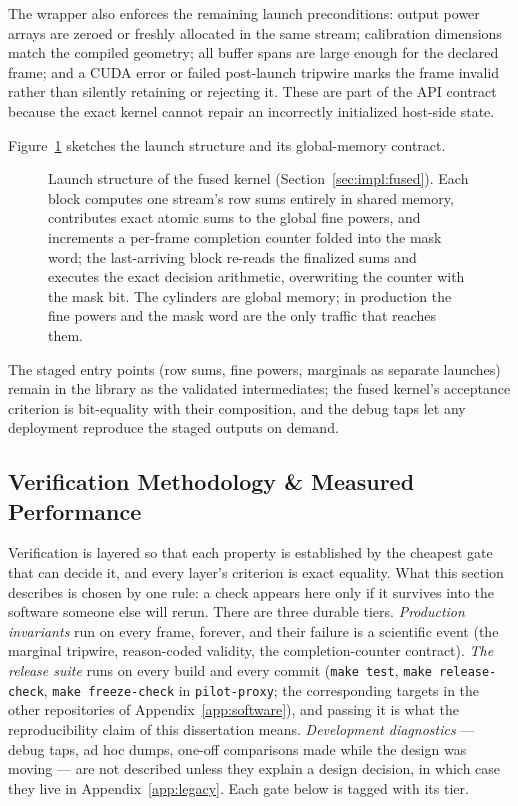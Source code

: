 The wrapper also enforces the remaining launch preconditions: output power arrays are zeroed or freshly allocated in the same stream; calibration dimensions match the compiled geometry; all buffer spans are large enough for the declared frame; and a CUDA error or failed post-launch tripwire marks the frame invalid rather than silently retaining or rejecting it.  These are part of the API contract because the exact kernel cannot repair an incorrectly initialized host-side state.

Figure~\ref{fig:fused} sketches the launch structure and its global-memory contract.

\begin{figure}[t]
\centering
\resizebox{\linewidth}{!}{}
\caption[Launch structure of the fused kernel]{Launch structure of the fused kernel (Section~\ref{sec:impl:fused}). Each block computes one stream's row sums entirely in shared memory, contributes exact atomic sums to the global fine powers, and increments a per-frame completion counter folded into the mask word; the last-arriving block re-reads the finalized sums and executes the exact decision arithmetic, overwriting the counter with the mask bit. The cylinders are global memory; in production the fine powers and the mask word are the only traffic that reaches them.}
\label{fig:fused}
\end{figure}

The staged entry points (row sums, fine powers, marginals as separate launches) remain in the library as the validated intermediates; the fused kernel's acceptance criterion is bit-equality with their composition, and the debug taps let any deployment reproduce the staged outputs on demand.

\subsection{Verification Methodology \& Measured Performance}
\label{sec:impl:verify}
Verification is layered so that each property is established by the cheapest gate that can decide it, and every layer's criterion is exact equality. What this section describes is chosen by one rule: a check appears here only if it survives into the software someone else will rerun. There are three durable tiers. \emph{Production invariants} run on every frame, forever, and their failure is a scientific event (the marginal tripwire, reason-coded validity, the completion-counter contract). \emph{The release suite} runs on every build and every commit (\texttt{make test}, \texttt{make release-check}, \texttt{make freeze-check} in \texttt{pilot-proxy}; the corresponding targets in the other repositories of Appendix~\ref{app:software}), and passing it is what the reproducibility claim of this dissertation means. \emph{Development diagnostics} --- debug taps, ad hoc dumps, one-off comparisons made while the design was moving --- are not described unless they explain a design decision, in which case they live in Appendix~\ref{app:legacy}. Each gate below is tagged with its tier.

